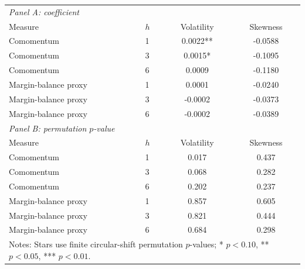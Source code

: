 \begingroup\small\setlength{\tabcolsep}{2.5pt}
\begin{tabular}{llcc}
\toprule
\multicolumn{4}{l}{\textit{Panel A: coefficient}} \\
Measure & $h$ & Volatility & Skewness \\
\midrule
Comomentum & 1 & 0.0022** & -0.0588 \\
Comomentum & 3 & 0.0015* & -0.1095 \\
Comomentum & 6 & 0.0009 & -0.1180 \\
Margin-balance proxy & 1 & 0.0001 & -0.0240 \\
Margin-balance proxy & 3 & -0.0002 & -0.0373 \\
Margin-balance proxy & 6 & -0.0002 & -0.0389 \\
\midrule
\multicolumn{4}{l}{\textit{Panel B: permutation $p$-value}} \\
Measure & $h$ & Volatility & Skewness \\
\midrule
Comomentum & 1 & 0.017 & 0.437 \\
Comomentum & 3 & 0.068 & 0.282 \\
Comomentum & 6 & 0.202 & 0.237 \\
Margin-balance proxy & 1 & 0.857 & 0.605 \\
Margin-balance proxy & 3 & 0.821 & 0.444 \\
Margin-balance proxy & 6 & 0.684 & 0.298 \\
\midrule
\multicolumn{4}{l}{\parbox{\dimexpr\textwidth-10pt\relax}{\footnotesize Notes: Stars use finite circular-shift permutation $p$-values; * $p<0.10$, ** $p<0.05$, *** $p<0.01$.}} \\
\bottomrule
\end{tabular}

\endgroup